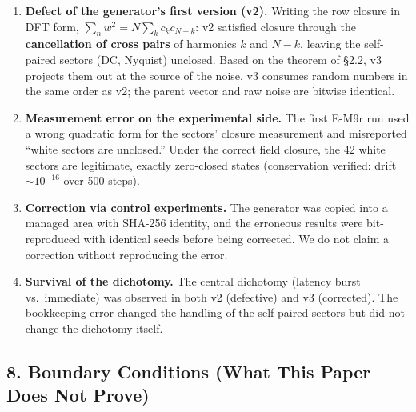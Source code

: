 \documentclass[
  a4paper,
]{article}
\providecommand{\tightlist}{%
  \setlength{\itemsep}{0pt}\setlength{\parskip}{0pt}}
\begin{document}
\begin{enumerate}
\def\labelenumi{\arabic{enumi}.}
\tightlist
\item
  \textbf{Defect of the generator's first version (v2).} Writing the row
  closure in DFT form, \(\sum_n w^2=N\sum_k c_kc_{N-k}\): v2 satisfied
  closure through the \textbf{cancellation of cross pairs} of harmonics
  \(k\) and \(N-k\), leaving the self-paired sectors (DC, Nyquist)
  unclosed. Based on the theorem of §2.2, v3 projects them out at the
  source of the noise. v3 consumes random numbers in the same order as
  v2; the parent vector and raw noise are bitwise identical.
\item
  \textbf{Measurement error on the experimental side.} The first E-M9r
  run used a wrong quadratic form for the sectors' closure measurement
  and misreported ``white sectors are unclosed.'' Under the correct
  field closure, the 42 white sectors are legitimate, exactly
  zero-closed states (conservation verified: drift \(\sim10^{-16}\) over
  500 steps).
\item
  \textbf{Correction via control experiments.} The generator was copied
  into a managed area with SHA-256 identity, and the erroneous results
  were bit-reproduced with identical seeds before being corrected. We do
  not claim a correction without reproducing the error.
\item
  \textbf{Survival of the dichotomy.} The central dichotomy (latency
  burst vs.~immediate) was observed in both v2 (defective) and v3
  (corrected). The bookkeeping error changed the handling of the
  self-paired sectors but did not change the dichotomy itself.
\end{enumerate}

\subsection{8. Boundary Conditions (What This Paper Does Not
Prove)}\label{boundary-conditions-what-this-paper-does-not-prove}
\end{document}
